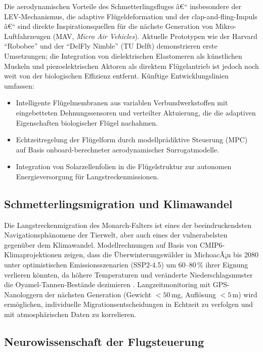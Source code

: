 ﻿\documentclass[a4paper,12pt]{article}
\theoremstyle{definition}
\begin{document}
	Die aerodynamischen Vorteile des Schmetterlingsfluges â€“ insbesondere der
	LEV-Mecha\-nismus, die adaptive Flügeldeformation und der clap-and-fling-Impuls â€“
	sind direkte Inspirationsquellen für die nächste Generation von
	Mikro-Luftfahrzeugen (MAV, \textit{Micro Air Vehicles}).
	Aktuelle Prototypen wie der Harvard ``Robobee'' \cite{wood2008first}
	und der ``DelFly Nimble'' (TU Delft) demonstrieren erste Umsetzungen;
	die Integration von dielektrischen Elastomeren als künstlichen Muskeln
	und piezoelektrischen Aktoren als direktem Flügelantrieb ist jedoch noch weit
	von der biologischen Effizienz entfernt.
	Künftige Entwicklungslinien umfassen:
	\begin{itemize}
		\item Intelligente Flügelmembranen aus variablen Verbundwerkstoffen mit
		eingebetteten Dehnungssensoren und verteilter Aktuierung,
		die die adaptiven Eigenschaften biologischer Flügel nachahmen.
		\item Echtzeitregelung der Flügelform durch modellprädiktive Steuerung
		(MPC) auf Basis onboard-berechneter aerodynamischer Surrogatmodelle.
		\item Integration von Solarzellenfolien in die Flügelstruktur zur
		autonomen Energieversorgung für Langstreckenmissionen.
	\end{itemize}
	
	\subsection{Schmetterlingsmigration und Klimawandel}
	
	Die Langstreckenmigration des Monarch-Falters ist eines der beeindruckendsten
	Navigationsphänomene der Tierwelt, aber auch eines der vulnerabelsten gegenüber
	dem Klimawandel.
	Modellrechnungen auf Basis von CMIP6-Klimaprojektionen zeigen,
	dass die Überwinterungswälder in MichoacÃ¡n bis 2080 unter optimistischen
	Emissionsszenarien (SSP2-4.5) um 60--80\,\% ihrer Eignung verlieren könnten,
	da höhere Temperaturen und veränderte Niederschlagsmuster die
	Oyamel-Tannen-Bestände dezimieren \cite{oberhauser2004monarch}.
	Langzeitmonitoring mit GPS-Nanologgern der nächsten Generation
	(Gewicht $< 50$\,mg, Auflösung $< 5$\,m) wird ermöglichen,
	individuelle Migrationsentscheidungen in Echtzeit zu verfolgen und
	mit atmosphärischen Daten zu korrelieren.
	
	\subsection{Neurowissenschaft der Flugsteuerung}
	
\end{document}
